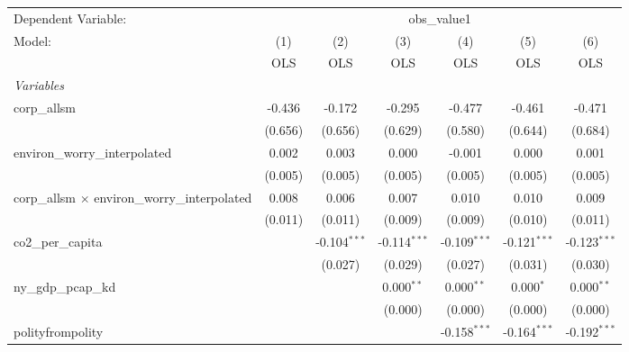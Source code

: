 
\begingroup
\centering
\begin{tabular}{lcccccc}
   \toprule
   Dependent Variable: & \multicolumn{6}{c}{obs\_value1}\\
   Model:                                                & (1)     & (2)            & (3)            & (4)            & (5)            & (6)\\  
                                                         &  OLS    & OLS            & OLS            & OLS            & OLS            & OLS\\  
   \midrule
   \emph{Variables}\\
   corp\_allsm                                           & -0.436  & -0.172         & -0.295         & -0.477         & -0.461         & -0.471\\   
                                                         & (0.656) & (0.656)        & (0.629)        & (0.580)        & (0.644)        & (0.684)\\   
   environ\_worry\_interpolated                          & 0.002   & 0.003          & 0.000          & -0.001         & 0.000          & 0.001\\   
                                                         & (0.005) & (0.005)        & (0.005)        & (0.005)        & (0.005)        & (0.005)\\   
   corp\_allsm $\times$ environ\_worry\_interpolated     & 0.008   & 0.006          & 0.007          & 0.010          & 0.010          & 0.009\\   
                                                         & (0.011) & (0.011)        & (0.009)        & (0.009)        & (0.010)        & (0.011)\\   
   co2\_per\_capita                                      &         & -0.104$^{***}$ & -0.114$^{***}$ & -0.109$^{***}$ & -0.121$^{***}$ & -0.123$^{***}$\\   
                                                         &         & (0.027)        & (0.029)        & (0.027)        & (0.031)        & (0.030)\\   
   ny\_gdp\_pcap\_kd                                     &         &                & 0.000$^{**}$   & 0.000$^{**}$   & 0.000$^{*}$    & 0.000$^{**}$\\   
                                                         &         &                & (0.000)        & (0.000)        & (0.000)        & (0.000)\\   
   polityfrompolity                                      &         &                &                & -0.158$^{***}$ & -0.164$^{***}$ & -0.192$^{***}$\\   

\end{tabular}
